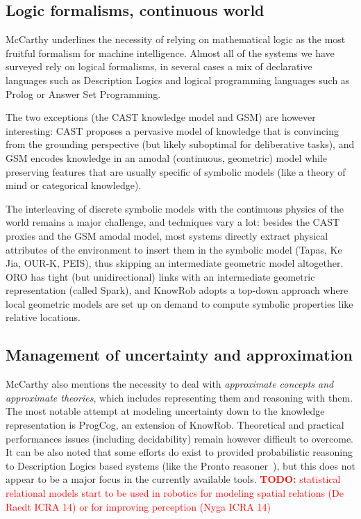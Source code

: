 \documentclass[journal]{IEEEtran}
\newcommand{\todo}[1]{\textcolor{red}{\textbf{TODO:} #1}}
\begin{document}
\subsection{Logic formalisms, continuous world}
McCarthy underlines the necessity of relying on mathematical logic as the most
fruitful formalism for machine intelligence. Almost all of the systems we have 
surveyed rely on logical formalisms, in several cases a mix of declarative 
languages such as Description Logics and logical programming languages such as 
Prolog or Answer Set Programming.

The two exceptions (the CAST knowledge model and GSM) are however interesting: 
CAST proposes a pervasive model of knowledge that is convincing from the 
grounding perspective (but likely suboptimal for deliberative tasks), and GSM 
encodes knowledge in an amodal (continuous, geometric) model while preserving 
features that are usually specific of symbolic models (like a theory of mind 
or categorical knowledge).

The interleaving of discrete symbolic models with the continuous physics of the
world remains a major challenge, and techniques vary a lot: besides the CAST
proxies and the GSM amodal model, most systems directly extract physical
attributes of the environment to insert them in the symbolic model ({\sc Tapas},
Ke Jia, OUR-K, PEIS), thus skipping an intermediate geometric model altogether.
ORO has tight (but unidirectional) links with an intermediate geometric
representation (called {\sc Spark}), and {\sc KnowRob} adopts a top-down approach
where local geometric models are set up on demand to compute symbolic properties
like relative locations.

\subsection{Management of uncertainty and approximation}

McCarthy also mentions the necessity to deal with \emph{approximate concepts
and approximate theories}, which includes representing them and reasoning with
them.
The most notable attempt at modeling uncertainty down to the knowledge
representation is {\sc ProgCog}, an extension of {\sc KnowRob}. Theoretical
and practical performances issues (including decidability) remain however
difficult to overcome.
It can be also noted that some efforts do exist to provided probabilistic
reasoning to Description Logics based systems (like the {\sc Pronto}
reasoner~\cite{Klinov2008}), but this does not appear to be a major focus in the
currently available tools. \todo{statistical relational models start to be 
used in robotics for modeling spatial relations (De Raedt ICRA 14) or for 
improving perception (Nyga ICRA 14)}
\end{document}
